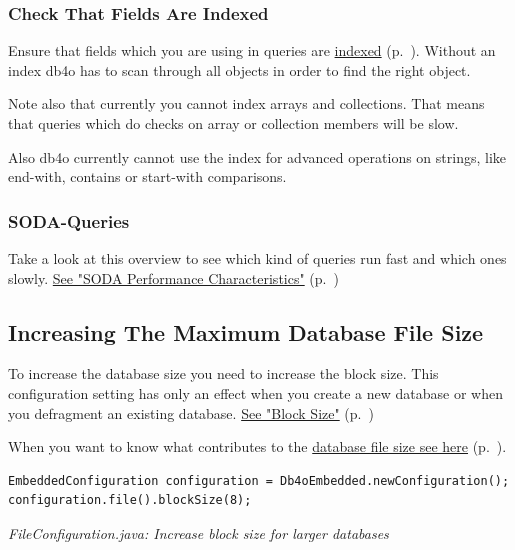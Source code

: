 \subsubsection*{Check That Fields Are Indexed}

Ensure that fields which you are using in queries are  \hyperref[ref:basics-indexing]{indexed} (p.~\pageref{ref:basics-indexing}). Without an index db4o has to scan through all objects in order to find the right object.

Note also that currently you cannot index arrays and collections. That means that queries which do checks on array or collection members will be slow.

Also db4o currently cannot use the index for advanced operations on strings, like end-with, contains or start-with comparisons.

\subsubsection*{SODA-Queries}

Take a look at this overview to see which kind of queries run fast and which ones slowly. \hyperref[ref:basics-querying-soda-soda-performance-characteristics]{See "SODA Performance Characteristics"} (p.~\pageref{ref:basics-querying-soda-soda-performance-characteristics})

\subsection{Increasing The Maximum Database File Size}
\label{ref:troubleshoot-increasing-the-maximum-database-file-size}

To increase the database size you need to increase the block size. This configuration setting has only an effect when you create a new database or when you defragment an existing database. \hyperref[ref:configuration-file-block-size]{See "Block Size"} (p.~\pageref{ref:configuration-file-block-size})

When you want to know what contributes to the \hyperref[ref:troubleshoot-database-size]{database file size see here} (p.~\pageref{ref:troubleshoot-database-size}).

\begin{lstlisting}
EmbeddedConfiguration configuration = Db4oEmbedded.newConfiguration();
configuration.file().blockSize(8);
\end{lstlisting}

{\small\itshape FileConfiguration.java: Increase block size for larger databases\par}
\medskip

